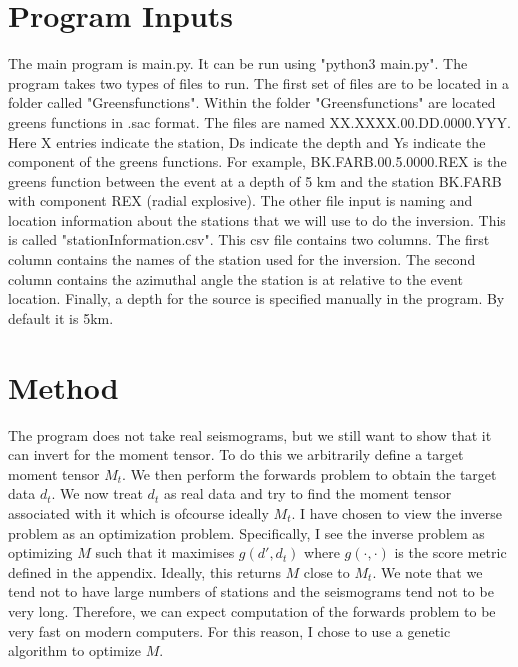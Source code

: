 \documentclass{article}
\begin{document}
\section*{Program Inputs}
The main program is main.py. It can be run using "python3 main.py". 
\newline
The program takes two types of files to run. The first set of files are to be located in a folder called "Greensfunctions". Within the folder 
"Greensfunctions" are located greens functions in .sac format. The files are named XX.XXXX.00.DD.0000.YYY. Here X entries indicate the station, Ds 
indicate the depth and Ys indicate the component of the greens functions. For example, BK.FARB.00.5.0000.REX is the greens function between the event at a 
depth of 5 km and the station BK.FARB with component REX (radial explosive). The other file input is naming and location information about the stations 
that we will use to do the inversion. This is called "stationInformation.csv". This csv file contains two columns. The first column contains the names of 
the station used for the inversion. The second column contains the azimuthal angle the station is at relative to the event location. Finally, a depth for 
the source is specified manually in the program. By default it is 5km.

\section*{Method}
The program does not take real seismograms, but we still want to show that it can invert for the moment tensor. To do this we arbitrarily define a target moment tensor $M_t$. We then perform the forwards problem to obtain the target data $d_t$. We now treat $d_t$ as real data and try to find the moment tensor associated with it which is ofcourse ideally $M_t$. 
\newline
I have chosen to view the inverse problem as an optimization problem. Specifically, I see the inverse problem as optimizing $M$ such that it maximises 
$g(d',d_t)$ where $g(\cdot, \cdot)$ is the score metric defined in the appendix. Ideally, this returns $M$ close to $M_t$. We note that we tend not to have large numbers
 of stations and the seismograms tend not to be very long. Therefore, we can expect computation of the forwards problem to be very fast on modern 
 computers. For this reason, I chose to use a genetic algorithm to optimize $M$.
\end{document}
